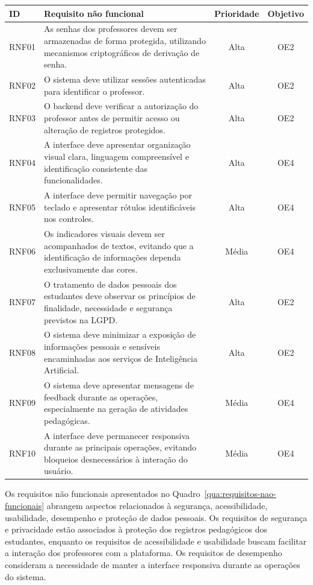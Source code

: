\begin{quadro}[H]
\centering
\caption{Requisitos não funcionais do sistema}
\label{qua:requisitos-nao-funcionais}
\begin{tabular}{|l|p{8cm}|c|c|}
\hline
\textbf{ID} & \textbf{Requisito não funcional} & \textbf{Prioridade} & \textbf{Objetivo} \\
\hline
RNF01 & As senhas dos professores devem ser armazenadas de forma protegida, utilizando mecanismos criptográficos de derivação de senha. & Alta & OE2 \\
\hline
RNF02 & O sistema deve utilizar sessões autenticadas para identificar o professor. & Alta & OE2 \\
\hline
RNF03 & O backend deve verificar a autorização do professor antes de permitir acesso ou alteração de registros protegidos. & Alta & OE2 \\
\hline
RNF04 & A interface deve apresentar organização visual clara, linguagem compreensível e identificação consistente das funcionalidades. & Alta & OE4 \\
\hline
RNF05 & A interface deve permitir navegação por teclado e apresentar rótulos identificáveis nos controles. & Alta & OE4 \\
\hline
RNF06 & Os indicadores visuais devem ser acompanhados de textos, evitando que a identificação de informações dependa exclusivamente das cores. & Média & OE4 \\
\hline
RNF07 & O tratamento de dados pessoais dos estudantes deve observar os princípios de finalidade, necessidade e segurança previstos na LGPD. & Alta & OE2 \\
\hline
RNF08 & O sistema deve minimizar a exposição de informações pessoais e sensíveis encaminhadas aos serviços de Inteligência Artificial. & Alta & OE2 \\
\hline
RNF09 & O sistema deve apresentar mensagens de feedback durante as operações, especialmente na geração de atividades pedagógicas. & Média & OE4 \\
\hline
RNF10 & A interface deve permanecer responsiva durante as principais operações, evitando bloqueios desnecessários à interação do usuário. & Média & OE4 \\
\hline
\end{tabular}
\end{quadro}

Os requisitos não funcionais apresentados no Quadro~\ref{qua:requisitos-nao-funcionais} abrangem aspectos relacionados à segurança, acessibilidade, usabilidade, desempenho e proteção de dados pessoais. Os requisitos de segurança e privacidade estão associados à proteção dos registros pedagógicos dos estudantes, enquanto os requisitos de acessibilidade e usabilidade buscam facilitar a interação dos professores com a plataforma. Os requisitos de desempenho consideram a necessidade de manter a interface responsiva durante as operações do sistema.

